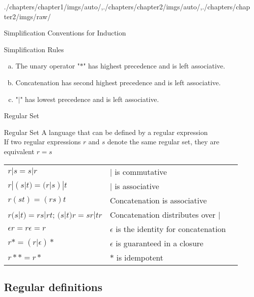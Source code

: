 \begin{graphicspathcontext}{{./chapters/chapter1/imgs/auto/},{./chapters/chapter2/imgs/auto/},{./chapters/chapter2/imgs/raw/}}
\begin{bibunit}[apalike]
\begin{frame}{Simplification Conventions for Induction}
	\vspace{1cm}
	\begin{block}{Simplification Rules}
		\begin{enumerate}[a)]
			\item The unary operator "$*$" has highest precedence and is left associative.
			\item Concatenation has second highest precedence and is left associative.
			\item "$|$" has lowest precedence and is left associative.
		\end{enumerate}
	\end{block}
\end{frame}

\begin{frame}{Regular Set}
	\begin{definitionblock}{Regular Set}
		A language that can be defined by a regular expression \\
		\smaller If two regular expressions $r$ and $s$ denote the same regular set, they are equivalent $r = s$
	\end{definitionblock}
	\vspace{.5cm}
	\begin{tabularx}{\linewidth}{|X|X|X|}
		\hline
		\tabularheading\chead{Law}&\chead{Description} \\
		\hline
		$r|s = s|r$ & $|$ is commutative \\
		\hline
		$r|(s|t) = (r|s)|t$ & $|$ is associative \\
		\hline
		$r(st) = (rs)t$ & Concatenation is associative \\
		\hline
		$r(s|t) = rs|rt$; $(s|t)r = sr|tr$ & Concatenation distributes over $|$ \\
		\hline
		$\epsilon r = r\epsilon = r$ & $\epsilon$ is the identity for concatenation \\
		\hline
		$r* = (r|\epsilon)*$ & $\epsilon$ is guaranteed in a closure \\
		\hline
		$r** = r*$ & $*$ is idempotent \\
		\hline
	\end{tabularx}
\end{frame}

\subsection{Regular definitions}
\subsectiontableofcontentslide


\end{bibunit}
\end{graphicspathcontext}
